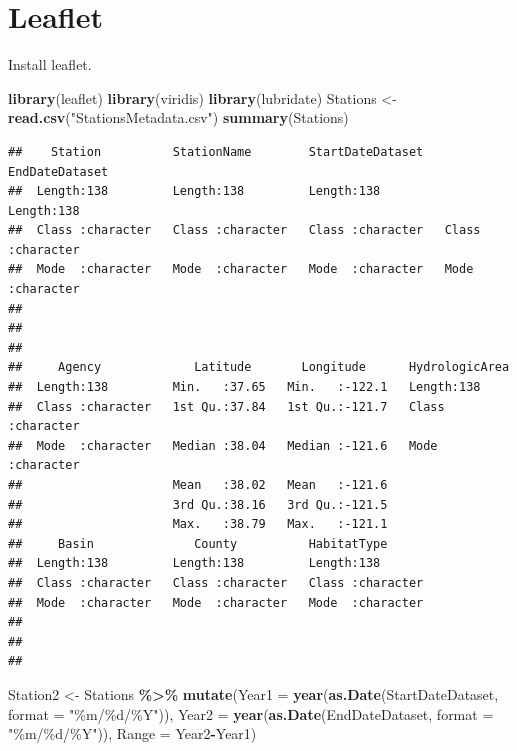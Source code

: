 \documentclass[
]{book}
\newenvironment{Shaded}{\begin{snugshade}}{\end{snugshade}}
\newcommand{\DataTypeTok}[1]{\textcolor[rgb]{0.13,0.29,0.53}{#1}}
\newcommand{\KeywordTok}[1]{\textcolor[rgb]{0.13,0.29,0.53}{\textbf{#1}}}
\newcommand{\NormalTok}[1]{#1}
\newcommand{\OperatorTok}[1]{\textcolor[rgb]{0.81,0.36,0.00}{\textbf{#1}}}
\newcommand{\StringTok}[1]{\textcolor[rgb]{0.31,0.60,0.02}{#1}}
\begin{document}
\hypertarget{leaflet}{%
\section{Leaflet}\label{leaflet}}

Install leaflet.

\begin{Shaded}
\begin{Highlighting}[]
\KeywordTok{library}\NormalTok{(leaflet)}
\KeywordTok{library}\NormalTok{(viridis)}
\KeywordTok{library}\NormalTok{(lubridate)}
\NormalTok{Stations \textless{}{-}}\StringTok{ }\KeywordTok{read.csv}\NormalTok{(}\StringTok{"StationsMetadata.csv"}\NormalTok{)}
\KeywordTok{summary}\NormalTok{(Stations)}
\end{Highlighting}
\end{Shaded}

\begin{verbatim}
##    Station          StationName        StartDateDataset   EndDateDataset    
##  Length:138         Length:138         Length:138         Length:138        
##  Class :character   Class :character   Class :character   Class :character  
##  Mode  :character   Mode  :character   Mode  :character   Mode  :character  
##                                                                             
##                                                                             
##                                                                             
##     Agency             Latitude       Longitude      HydrologicArea    
##  Length:138         Min.   :37.65   Min.   :-122.1   Length:138        
##  Class :character   1st Qu.:37.84   1st Qu.:-121.7   Class :character  
##  Mode  :character   Median :38.04   Median :-121.6   Mode  :character  
##                     Mean   :38.02   Mean   :-121.6                     
##                     3rd Qu.:38.16   3rd Qu.:-121.5                     
##                     Max.   :38.79   Max.   :-121.1                     
##     Basin              County          HabitatType       
##  Length:138         Length:138         Length:138        
##  Class :character   Class :character   Class :character  
##  Mode  :character   Mode  :character   Mode  :character  
##                                                          
##                                                          
## 
\end{verbatim}

\begin{Shaded}
\begin{Highlighting}[]
\NormalTok{Station2 \textless{}{-}}\StringTok{ }\NormalTok{Stations }\OperatorTok{\%\textgreater{}\%}
\StringTok{  }\KeywordTok{mutate}\NormalTok{(}\DataTypeTok{Year1 =} \KeywordTok{year}\NormalTok{(}\KeywordTok{as.Date}\NormalTok{(StartDateDataset, }\DataTypeTok{format =} \StringTok{"\%m/\%d/\%Y"}\NormalTok{)),}
         \DataTypeTok{Year2 =} \KeywordTok{year}\NormalTok{(}\KeywordTok{as.Date}\NormalTok{(EndDateDataset, }\DataTypeTok{format =} \StringTok{"\%m/\%d/\%Y"}\NormalTok{)),}
         \DataTypeTok{Range =}\NormalTok{ Year2}\OperatorTok{{-}}\NormalTok{Year1)}
\end{Highlighting}
\end{Shaded}
\end{document}
